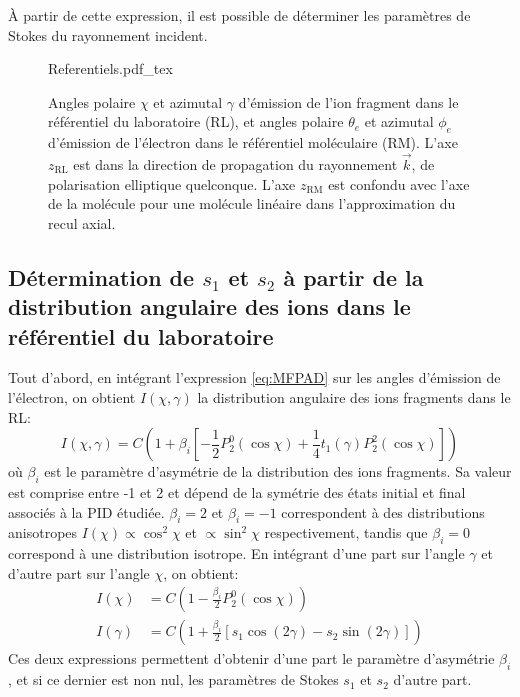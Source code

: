 \`{A} partir de cette expression, il est possible de déterminer les paramètres de Stokes du rayonnement incident.

\begin{figure}
\centering
\def\svgwidth{0.5\textwidth}
{Referentiels.pdf_tex}
\caption{Angles polaire $\chi$ et azimutal $\gamma$ d'émission de l'ion fragment dans le référentiel du laboratoire (RL), et angles polaire $\theta_e$ et azimutal $\phi_e$ d'émission de l'électron dans le référentiel moléculaire (RM). L'axe $z_{\text{RL}}$ est dans la direction de propagation du rayonnement $\vec{k}$, de polarisation elliptique quelconque. L'axe $z_{\text{RM}}$ est confondu avec l'axe de la molécule pour une molécule linéaire dans l'approximation du recul axial.}
\label{fig:Referentiels}
\end{figure}

\subsection{Détermination de $s_1$ et $s_2$ à partir de la distribution angulaire des ions dans le référentiel du laboratoire}
Tout d'abord, en intégrant l'expression \ref{eq:MFPAD} sur les angles d'émission de l'électron, on obtient $I(\chi, \gamma)$ la distribution angulaire des ions fragments dans le RL:
\begin{equation}
I(\chi, \gamma) = C \left( 1 + \beta_i \left[ - \frac{1}{2} P_2^0(\cos \chi) + \frac{1}{4} t_1(\gamma) P_2^2(\cos \chi) \right] \right)
\end{equation}
où $\beta_i$ est le paramètre d'asymétrie de la distribution des ions fragments. Sa valeur est comprise entre -1 et 2 et dépend de la symétrie des états initial et final associés à la PID étudiée. $\beta_i =2$ et $\beta_i = -1$ correspondent à des distributions anisotropes $I(\chi) \propto \cos^2 \chi$ et $\propto \sin^2 \chi$ respectivement, tandis que $\beta_i = 0$ correspond à une distribution isotrope. En intégrant d'une part sur l'angle $\gamma$ et d'autre part sur l'angle $\chi$, on obtient:
\begin{align}
I(\chi) & = C \left( 1 - \frac{\beta_i}{2} P_2^0(\cos \chi) \right) \\
I(\gamma) & = C \left( 1 + \frac{\beta_i}{2} \left[ s_1 \cos (2\gamma) - s_2 \sin (2\gamma) \right] \right)
\end{align}
Ces deux expressions permettent d'obtenir d'une part le paramètre d'asymétrie $\beta_i$, et si ce dernier est non nul, les paramètres de Stokes $s_1$ et $s_2$ d'autre part.

